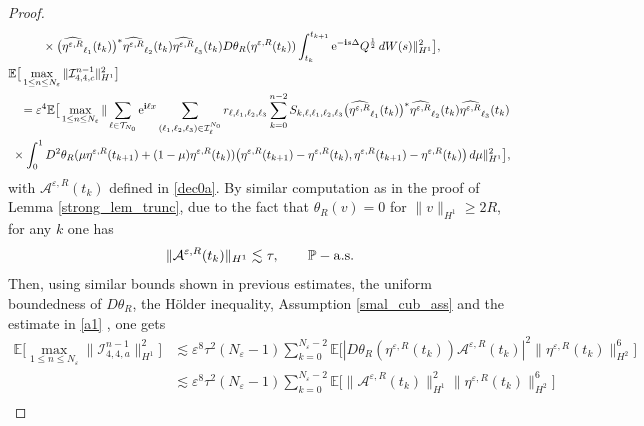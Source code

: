 \documentclass[a4paper]{amsart}
\begin{document}
\begin{proof}
\begin{align*}
    &\hspace{1cm}\times \big(\widehat{\eta^{\varepsilon,R}}_{\ell_1}(t_{k})\big)^*\widehat{\eta^{\varepsilon,R}}_{\ell_2}(t_{k})\widehat{\eta^{\varepsilon,R}}_{\ell_3}(t_{k})D\theta_R(\eta^{\varepsilon,R}(t_k))\int_{t_k}^{t_{k+1}}{\rm e}^{-{\bf i}s\Delta}Q^{\frac{1}{2}}\,dW(s)\|^2_{H^1}\big],\\
    &\mathbb{E}\big[\max_{1\le n\le N_\varepsilon}\|\mathcal{I}^{n-1}_{4,4,c}\|^2_{H^1}\big]\\
    &\quad = \varepsilon^4 \mathbb{E}\big[\max_{1\le n\le N_\varepsilon}\|\sum_{\ell\in\mathcal{T}_{N_0}}{\rm e}^{{\bf i}\ell x}\sum_{(\ell_1,\ell_2,\ell_3)\in\mathcal{I}_{\ell}^{N_0}}
    r_{\ell,\ell_1,\ell_2,\ell_3}\sum_{k=0}^{n-2}S_{k,\ell,\ell_1,\ell_2,\ell_3} \big(\widehat{\eta^{\varepsilon,R}}_{\ell_1}(t_{k})\big)^*\widehat{\eta^{\varepsilon,R}}_{\ell_2}(t_{k})\widehat{\eta^{\varepsilon,R}}_{\ell_3}(t_{k})\\
    &\hspace{0.1cm}\times \int_0^1 D^2\theta_R(\mu \eta^{\varepsilon,R}(t_{k+1})+(1-\mu)\eta^{\varepsilon,R}(t_k))
    \big(\eta^{\varepsilon,R}(t_{k+1})-\eta^{\varepsilon,R}(t_k),\eta^{\varepsilon,R}(t_{k+1})-\eta^{\varepsilon,R}(t_k)\big)\,d\mu\|^2_{H^1}\big],
   \end{align*}
   with $\mathcal{A}^{\varepsilon,R}(t_k)$ defined in \eqref{dec0a}. By similar computation as in the proof of Lemma \ref{strong_lem_trunc}, due to the fact that $\theta_R(v)=0$ for $\|v\|_{H^1}\ge 2R$, for any $k$ one has 
   \begin{equation}
       \label{a1}
       \|\mathcal{A}^{\varepsilon,R}(t_k)\|_{H^1}\lesssim \tau, \qquad \mathbb{P}-{\rm a.s.}
   \end{equation}
   Then, using similar bounds shown in previous estimates, the uniform boundedness of $D\theta_R$, the Hölder inequality, Assumption \ref{smal_cub_ass} and the estimate in \eqref{a1} , one gets
   \begin{align*}
       \mathbb{E}\big[\max_{1\le n\le N_\varepsilon}\|\mathcal{I}^{n-1}_{4,4,a}\|^2_{H^1}\big]&\lesssim \varepsilon^8 \tau^2 (N_\varepsilon-1) \sum_{k=0}^{N_\varepsilon-2} \mathbb{E}\big[|D\theta_R(\eta^{\varepsilon,R}(t_k)) \mathcal{A}^{\varepsilon,R}(t_k)|^2 \|\eta^{\varepsilon,R}(t_k)\|^6_{H^2}\big]\\
       &\lesssim \varepsilon^8 \tau^2 (N_\varepsilon-1)  \sum_{k=0}^{N_\varepsilon-2} \mathbb{E}\big[\|\mathcal{A}^{\varepsilon,R}(t_k)\|^2_{H^1} \|\eta^{\varepsilon,R}(t_k)\|^6_{H^2} \big]\\

\end{align*}
\end{proof}
\end{document}
